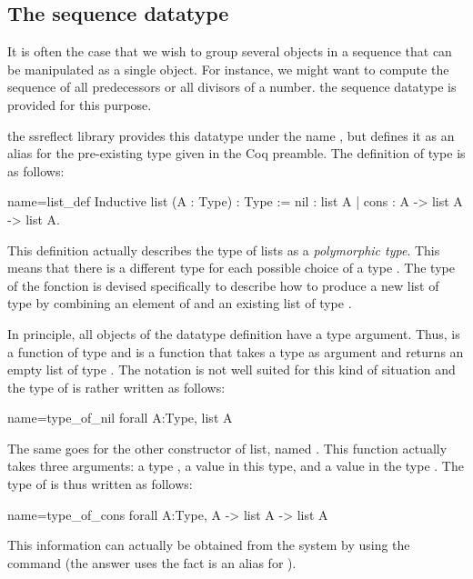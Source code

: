 \subsection{The sequence datatype}
It is often the case that we wish to group several objects in a
sequence that can be manipulated as a single object.  For instance, we
might want to compute the sequence of all predecessors or all divisors
of a number.  the sequence datatype is provided for this purpose.

the ssreflect library provides this datatype under the name ,
but defines it as an alias for the pre-existing type  given in the
Coq preamble.  The definition of type  is as follows:

\begin{coq}{name=list_def}{}
Inductive list (A : Type) : Type :=
  nil : list A
| cons : A -> list A -> list A.
\end{coq}
This definition actually describes the type of lists as a {\em
  polymorphic type}.  This means that there is a different type
 for each possible choice of a type .  The type of the
fonction  is devised specifically to describe how to produce a
new list of type  by combining an element of  and an
existing list of type .

In principle, all objects of the datatype definition have a type
argument.  Thus,  is a function of type  and
 is a function that takes a type  as argument and returns
an empty list of type .  The notation  is not
well suited for this kind of situation and the type of  is
rather written as follows:

\begin{coq}{name=type_of_nil}{}
  forall A:Type, list A
\end{coq}
The same goes for the other constructor of list, named .  This
function actually takes three arguments: a type , a value in this
type, and a value in the type .  The type of  is
thus written as follows:

\begin{coq}{name=type_of_cons}{}
  forall A:Type, A -> list A -> list A
\end{coq}
This information can actually be obtained from the system by using the 
command  (the answer uses the fact  is an alias for ).

